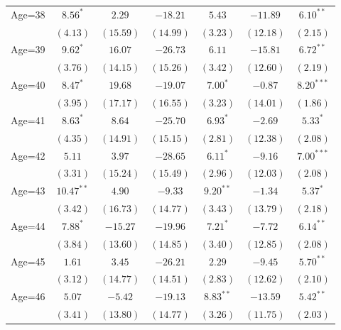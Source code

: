 \documentclass[fullpage]{paper}
\begin{document}
\begin{center}
\begin{longtable}{l c c c c c c }
Age=38      & $8.56^{*}$    & $2.29$        & $-18.21$      & $5.43$        & $-11.89$      & $6.10^{**}$   \\
            & $(4.13)$      & $(15.59)$     & $(14.99)$     & $(3.23)$      & $(12.18)$     & $(2.15)$      \\
Age=39      & $9.62^{*}$    & $16.07$       & $-26.73$      & $6.11$        & $-15.81$      & $6.72^{**}$   \\
            & $(3.76)$      & $(14.15)$     & $(15.26)$     & $(3.42)$      & $(12.60)$     & $(2.19)$      \\
Age=40      & $8.47^{*}$    & $19.68$       & $-19.07$      & $7.00^{*}$    & $-0.87$       & $8.20^{***}$  \\
            & $(3.95)$      & $(17.17)$     & $(16.55)$     & $(3.23)$      & $(14.01)$     & $(1.86)$      \\
Age=41      & $8.63^{*}$    & $8.64$        & $-25.70$      & $6.93^{*}$    & $-2.69$       & $5.33^{*}$    \\
            & $(4.35)$      & $(14.91)$     & $(15.15)$     & $(2.81)$      & $(12.38)$     & $(2.08)$      \\
Age=42      & $5.11$        & $3.97$        & $-28.65$      & $6.11^{*}$    & $-9.16$       & $7.00^{***}$  \\
            & $(3.31)$      & $(15.24)$     & $(15.49)$     & $(2.96)$      & $(12.03)$     & $(2.08)$      \\
Age=43      & $10.47^{**}$  & $4.90$        & $-9.33$       & $9.20^{**}$   & $-1.34$       & $5.37^{*}$    \\
            & $(3.42)$      & $(16.73)$     & $(14.77)$     & $(3.43)$      & $(13.79)$     & $(2.18)$      \\
Age=44      & $7.88^{*}$    & $-15.27$      & $-19.96$      & $7.21^{*}$    & $-7.72$       & $6.14^{**}$   \\
            & $(3.84)$      & $(13.60)$     & $(14.85)$     & $(3.40)$      & $(12.85)$     & $(2.08)$      \\
Age=45      & $1.61$        & $3.45$        & $-26.21$      & $2.29$        & $-9.45$       & $5.70^{**}$   \\
            & $(3.12)$      & $(14.77)$     & $(14.51)$     & $(2.83)$      & $(12.62)$     & $(2.10)$      \\
Age=46      & $5.07$        & $-5.42$       & $-19.13$      & $8.83^{**}$   & $-13.59$      & $5.42^{**}$   \\
            & $(3.41)$      & $(13.80)$     & $(14.77)$     & $(3.26)$      & $(11.75)$     & $(2.03)$      \\

\end{longtable}
\end{center}
\end{document}
